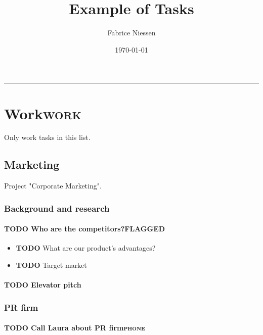 \documentclass[11pt]{article}
\author{Fabrice Niessen}
\date{\today}
\title{Example of Tasks}
\begin{document}
\maketitle
\setcounter{tocdepth}{4}
\tableofcontents

\noindent\rule{\textwidth}{0.5pt}

\section{Work\hfill{}\textsc{work}}
\label{sec:orgf142beb}
Only work tasks in this list.

\subsection{Marketing}
\label{sec:org9a4f501}
Project "Corporate Marketing".

\subsubsection*{Background and research}
\label{sec:org1e34b4e}

\paragraph*{{\bfseries\sffamily TODO} Who are the competitors?\hfill{}\textsc{FLAGGED}}
\label{sec:orga7533e8}

\begin{itemize}
\item {\bfseries\sffamily TODO} What are our product's advantages?
\label{sec:org4169327}

\item {\bfseries\sffamily TODO} Target market
\label{sec:orge14c9e4}
\end{itemize}

\paragraph*{{\bfseries\sffamily TODO} Elevator pitch}
\label{sec:orgcddad80}

\subsubsection*{PR firm}
\label{sec:org9d85deb}

\paragraph*{{\bfseries\sffamily TODO} Call Laura about PR firm\hfill{}\textsc{phone}}
\label{sec:orgf32111e}
\end{document}
